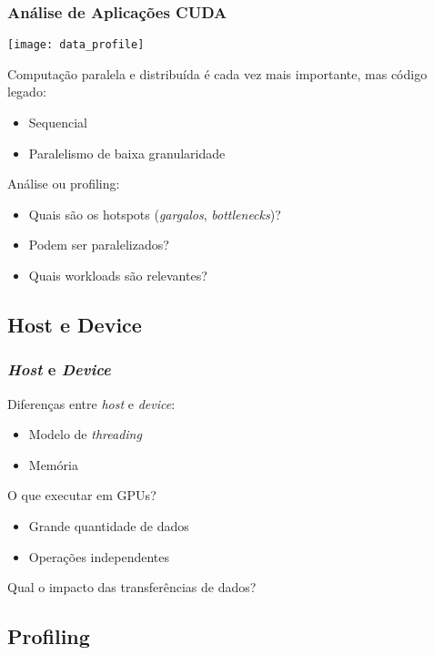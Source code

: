 \documentclass[10pt, compress, aspectratio=43, xcolor={table,usenames,dvipsnames}]{beamer}
\begin{document}
\begin{frame}
    \frametitle{Análise de Aplicações CUDA}
    \begin{center}
        \texttt{[image: data\_profile]}
    \end{center}

    Computação \alert{paralela} e \alert{distribuída} é cada vez mais
    importante, mas \alert{código legado}:
    \begin{itemize}
        \item \alert{Sequencial}
        \item Paralelismo de \alert{baixa granularidade}
    \end{itemize}

    Análise ou \alert{profiling}:
    \begin{itemize}
        \item Quais são os \alert{hotspots} (\textit{gargalos}, \textit{bottlenecks})?
        \item Podem ser paralelizados?
        \item Quais \alert{workloads} são relevantes?
    \end{itemize}
\end{frame}

\subsection{Host e Device}

\begin{frame}
    \frametitle{\textit{Host} e \textit{Device}}
    Diferenças entre \textit{host} e \textit{device}:
    \begin{itemize}
        \item Modelo de \textit{threading}
        \item Memória
    \end{itemize}

    O que executar em \alert{GPUs}?
    \begin{itemize}
        \item Grande quantidade de \alert{dados}
        \item Operações \alert{independentes}
    \end{itemize}

    Qual o impacto das \alert{transferências de dados}?
\end{frame}

\subsection{Profiling}
\end{document}
